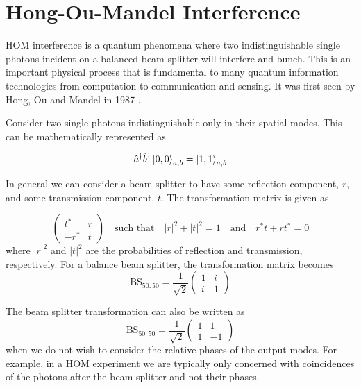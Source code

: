 \section{Hong-Ou-Mandel Interference}

\Ac{HOM} interference is a quantum phenomena where two indistinguishable single photons incident on a balanced beam splitter will interfere and bunch. This is an important physical process that is fundamental to many quantum information technologies from computation to communication and sensing. It was first seen by Hong, Ou and Mandel in 1987 \cite{HOM}. 

Consider two single photons indistinguishable only in their spatial modes. This can be mathematically represented as 

\begin{equation}
	\hat{a}^\dagger \hat{b}^\dagger \ket{0,0}_{a,b} = \ket{1,1}_{a,b}
\end{equation}

In general we can consider a beam splitter to have some reflection component, $r$, and some transmission component, $t$. The transformation matrix is given as 

\begin{equation}
	\left(
	\begin{matrix}
		t^\ast & r \\
		-r^\ast & t
	\end{matrix}
	\right)
	\quad\text{such that}\quad
	|r|^2 + |t|^2 = 1 
	\quad\text{and}\quad
	r^\ast t + r t^\ast = 0
\end{equation}
where $|r|^2$ and $|t|^2$ are the probabilities of reflection and transmission, respectively. For a balance beam splitter, the transformation matrix becomes
\begin{equation}
	\text{BS}_{50:50} = \frac{1}{\sqrt{2}}
	\left(
	\begin{matrix}
		1 & i \\
		i & 1
	\end{matrix}
	\right)	
\end{equation}

The beam splitter transformation can also be written as 
\begin{equation}
	\text{BS}_{50:50} = \frac{1}{\sqrt{2}}
	\left(
	\begin{matrix}
		1 & 1 \\
		1 & -1
	\end{matrix}
	\right)	
\end{equation}
when we do not wish to consider the relative phases of the output modes. For example, in a \ac{HOM} experiment we are typically only concerned with coincidences of the photons after the beam splitter and not their phases.

